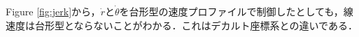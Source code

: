 \documentclass[twocolumn,oneside,a4paper]{article}
\begin{document}
Figure \ref{fig:jerk}から，$\dot{r}$と$\dot{\theta}$を台形型の速度プロファイルで制御したとしても，線速度は台形型とならないことがわかる．これはデカルト座標系との違いである．



\end{document}
